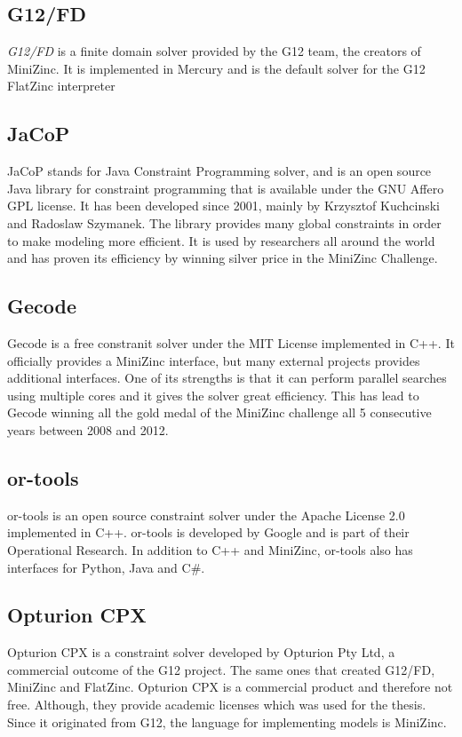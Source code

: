 \subsection{G12/FD}
\emph{G12/FD} is a finite domain solver provided by the G12 team, the creators of MiniZinc. It is implemented in Mercury and is the default solver for the G12 FlatZinc interpreter
\cite{nicta_2964}
\cite{mz_result_2014}
\subsection{JaCoP}
JaCoP stands for Java Constraint Programming solver, and is an open source Java library for constraint programming that is available under the GNU Affero GPL license. It has been developed since 2001, mainly by Krzysztof Kuchcinski and Radoslaw Szymanek. The library provides many global constraints in order to make modeling more efficient. It is used by researchers all around the world and has proven its efficiency by winning silver price in the MiniZinc Challenge.
\cite{jacop_overview}
\cite{jacop_about}
\subsection{Gecode}
Gecode is a free constranit solver under the MIT License implemented in C++. It officially provides a MiniZinc interface, but many external projects provides additional interfaces. One of its strengths is that it can perform parallel searches using multiple cores and it gives the solver great efficiency. This has lead to Gecode winning all the gold medal of the MiniZinc challenge all 5 consecutive years between 2008 and 2012.
\cite{gecode}
\subsection{or-tools}
or-tools is an open source constraint solver under the Apache License 2.0 implemented in C++. or-tools is developed by Google and is part of their Operational Research. In addition to C++ and MiniZinc, or-tools also has interfaces for Python, Java and C\#.
\cite{or_manual}
\subsection{Opturion CPX}
Opturion CPX is a constraint solver developed by Opturion Pty Ltd, a commercial outcome of the G12 project. The same ones that created G12/FD, MiniZinc and FlatZinc. Opturion CPX is a commercial product and therefore not free. Although, they provide academic licenses which was used for the thesis. Since it originated from G12, the language for implementing models is MiniZinc.

